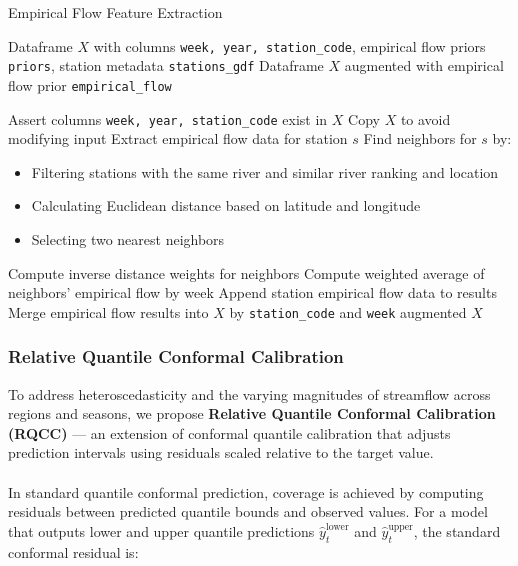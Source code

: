 \documentclass[ruler]{CUP-JNL-EDS}%
\begin{document}
\begin{algorithm}[!htp]
\caption{Empirical Flow Feature Extraction}
\begin{algorithmic}[1]
\Require Dataframe $X$ with columns \texttt{week, year, station\_code}, empirical flow priors \texttt{priors}, station metadata \texttt{stations\_gdf}
\Ensure Dataframe $X$ augmented with empirical flow prior \texttt{empirical\_flow}

\State Assert columns \texttt{week, year, station\_code} exist in $X$
\State Copy $X$ to avoid modifying input
        \State Extract empirical flow data for station $s$
    \Else
        \State Find neighbors for $s$ by:
        \begin{itemize}
            \item Filtering stations with the same river and similar river ranking and location
            \item Calculating Euclidean distance based on latitude and longitude
            \item Selecting two nearest neighbors
        \end{itemize}
        \State Compute inverse distance weights for neighbors
        \State Compute weighted average of neighbors' empirical flow by week
    \EndIf
    \State Append station empirical flow data to results
\EndFor
\State Merge empirical flow results into $X$ by \texttt{station\_code} and \texttt{week}
\State \Return augmented $X$
\end{algorithmic}
\end{algorithm}

\subsubsection*{Relative Quantile Conformal Calibration} 
To address heteroscedasticity and the varying magnitudes of streamflow across regions and seasons, 
we propose \textbf{Relative Quantile Conformal Calibration (RQCC)} — an extension of conformal quantile 
calibration that adjusts prediction intervals using residuals scaled relative to the target value.
\\ \\ 
In standard quantile conformal prediction, coverage is achieved by computing residuals between predicted 
quantile bounds and observed values. For a model that outputs lower and upper quantile predictions 
$\hat{y}_t^{\text{lower}}$ and $\hat{y}_t^{\text{upper}}$, the standard conformal residual is:
\end{document}
